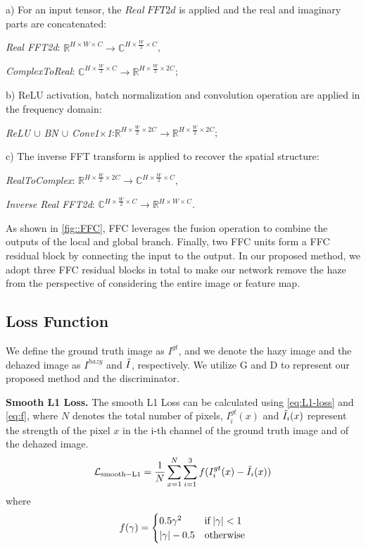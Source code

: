 \documentclass[10pt,twocolumn,letterpaper]{article}
\begin{document}
a) For an input tensor, the $Real\ FFT2d$ is applied and the real and imaginary parts are concatenated:

\textit{Real FFT2d}: $\mathbb{R}^{H\times W \times C} \rightarrow \mathbb{C}^{H\times \frac {W}{2} \times C}$,

\textit{ComplexToReal}: $\mathbb{C}^{H\times \frac {W}{2} \times C} \rightarrow \mathbb{R}^{H\times \frac {W}{2} \times {2C}}$;

b) ReLU activation, batch normalization and convolution operation are applied in the frequency domain:

\textit{ReLU $\cup$ BN $\cup$ Conv1$\times$1}:$\mathbb{R}^{H\times \frac {W}{2} \times {2C}}\rightarrow \mathbb{R}^{H\times \frac {W}{2} \times {2C}}$;

c) The inverse FFT transform is applied to recover the spatial structure:

\textit{RealToComplex}: $\mathbb{R}^{H\times \frac {W}{2} \times {2C}} \rightarrow \mathbb{C}^{H\times \frac {W}{2} \times {C}}$,

\textit{Inverse Real FFT2d}: $\mathbb{C}^{H\times \frac {W}{2} \times {C}} \rightarrow \mathbb{R}^{H\times W \times {C}}$.

As shown in \cref{fig::FFC}, FFC leverages the fusion operation to combine the outputs of the local and global branch. Finally, two FFC units form a FFC residual block by connecting the input to the output. In our proposed method, we adopt three FFC residual blocks in total to make our network remove the haze from the perspective of considering the entire image or feature map.
\subsection{Loss Function}
\label{sec:loss}
 We define the ground truth image as $I^{gt}$, and we denote the hazy image and the dehazed image as $I^{hazy}$ and $\Tilde{I}$, respectively. We utilize G and D to represent our proposed method and the discriminator.

\textbf{Smooth L1 Loss.} The smooth L1 Loss can be calculated using \cref{eq:L1-loss} and \cref{eq:f}, where $N$ denotes the total number of pixels, $I_{i}^{gt}(x)$ and $\Tilde{I}_{i}(x)$ represent the strength of the pixel $x$ in the i-th channel of the ground truth image and of the dehazed image.
\begin{equation}
\setlength\abovedisplayskip{0.1pt}%
\setlength\belowdisplayskip{0.1pt}
  \mathcal{L}_{\rm smooth-L1}= \frac{1}{N}\sum_{x=1}^N\sum_{i=1}^3f(I_{i}^{gt}(x)-\Tilde{I}_{i}(x))
  \label{eq:L1-loss}
\end{equation}
where 
\begin{equation}
\setlength\abovedisplayskip{0.1pt}%
\setlength\belowdisplayskip{0.1pt}
  f(\gamma)=
  \begin{cases}
      0.5\gamma^2 & {\rm if  \left| \gamma \right| < 1}\\
      \left| \gamma \right|-0.5& {\rm otherwise}
  \end{cases}
  \label{eq:f}
  \end{equation}
  
\end{document}
